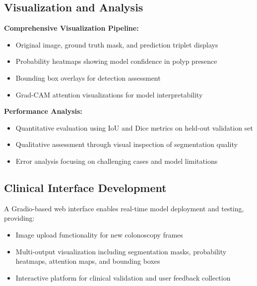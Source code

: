 \documentclass[a4paper,12pt]{report}
\begin{document}
\vspace{1em}

\subsection{Visualization and Analysis}

\noindent\textbf{\normalsize Comprehensive Visualization Pipeline:}
\vspace{0.5em}

\begin{itemize}
    \item Original image, ground truth mask, and prediction triplet displays
    \item Probability heatmaps showing model confidence in polyp presence
    \item Bounding box overlays for detection assessment
    \item Grad-CAM attention visualizations for model interpretability
\end{itemize}

\vspace{1em}

\noindent\textbf{\normalsize Performance Analysis:}
\vspace{0.5em}

\begin{itemize}
    \item Quantitative evaluation using IoU and Dice metrics on held-out validation set
    \item Qualitative assessment through visual inspection of segmentation quality
    \item Error analysis focusing on challenging cases and model limitations
\end{itemize}


\vspace{1em}

\subsection{Clinical Interface Development}

A Gradio-based web interface enables real-time model deployment and testing, providing:

\begin{itemize}
    \item Image upload functionality for new colonoscopy frames
    \item Multi-output visualization including segmentation masks, probability heatmaps, attention maps, and bounding boxes
    \item Interactive platform for clinical validation and user feedback collection
\end{itemize}
\end{document}
